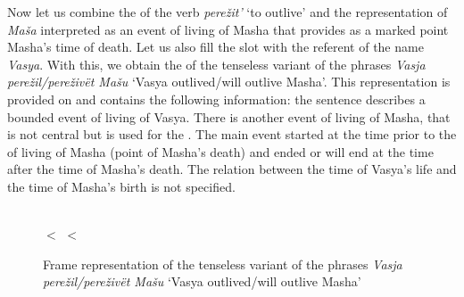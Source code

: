 Now let us combine the  of the verb \textit{pere\v{z}it'} `to outlive' and the representation of \textit{Ma\v{s}a} interpreted as an event of living of Masha that provides as a marked point Masha's time of death. Let us also fill the \ACTOR slot with the referent of the name \textit{Vasya}. With this, we obtain the  of the tenseless variant of the phrases \textit{Vasja pere\v{z}il/pere\v{z}iv\"{e}t Ma\v{s}u} `Vasya outlived/will outlive Masha'. This representation is provided on  and contains the following information: the sentence describes a bounded event  of living of Vasya. There is another event  of living of Masha, that is not central but is used for the . The main event  started at the time prior to the  of living of Masha (point of Masha's death) and ended or will end at the time after the time of Masha's death. The relation between the time of Vasya's life and the time of Masha's birth is not specified.

\begin{figure}
\begin{minipage}{0.6\textwidth}
\end{minipage}\hfill%
\begin{minipage}{0.35\textwidth}\centering
{}\\
 $<$  $<$ 
\end{minipage}
\caption{Frame representation of the tenseless variant of the phrases \textit{Vasja pere\v{z}il/pere\v{z}iv\"{e}t Ma\v{s}u} `Vasya outlived/will outlive Masha'  \label{frame:Vasja:outlive:Masha}}
\end{figure}

